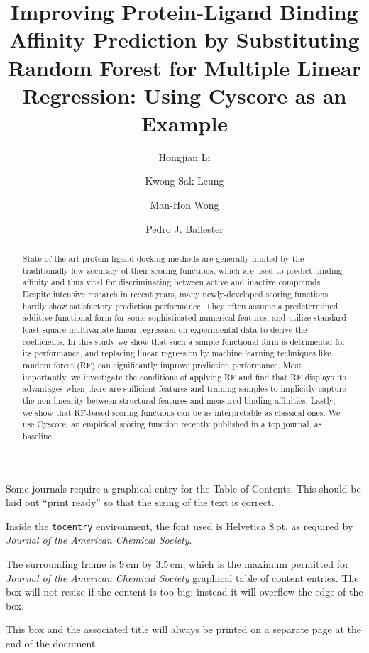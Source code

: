 \documentclass[journal=jacsat,manuscript=article]{achemso}
\author{Hongjian Li}
\author{Kwong-Sak Leung}
\author{Man-Hon Wong}
\affiliation[Chinese University of Hong Kong]
{Department of Computer Science and Engineering, Chinese University of Hong Kong, Shatin, New Territories, Hong Kong}
\author{Pedro J. Ballester}
\affiliation[European Bioinformatics Institute]
{European Bioinformatics Institute, Wellcome Trust Genome Campus, Hinxton, Cambridge - CB10 1SD, UK}
\title[RF::Cyscore]{Improving Protein-Ligand Binding Affinity Prediction by Substituting Random Forest for Multiple Linear Regression: Using Cyscore as an Example}
\begin{document}
\begin{tocentry}

Some journals require a graphical entry for the Table of Contents.
This should be laid out ``print ready'' so that the sizing of the
text is correct.

Inside the \texttt{tocentry} environment, the font used is Helvetica
8\,pt, as required by \emph{Journal of the American Chemical
Society}.

The surrounding frame is 9\,cm by 3.5\,cm, which is the maximum
permitted for  \emph{Journal of the American Chemical Society}
graphical table of content entries. The box will not resize if the
content is too big: instead it will overflow the edge of the box.

This box and the associated title will always be printed on a
separate page at the end of the document.

\end{tocentry}

\begin{abstract}

State-of-the-art protein-ligand docking methods are generally limited by the traditionally low accuracy of their scoring functions, which are used to predict binding affinity and thus vital for discriminating between active and inactive compounds. Despite intensive research in recent years, many newly-developed scoring functions hardly show satisfactory prediction performance. They often assume a predetermined additive functional form for some sophisticated numerical features, and utilize standard least-square multivariate linear regression on experimental data to derive the coefficients. In this study we show that such a simple functional form is detrimental for its performance, and replacing linear regression by machine learning techniques like random forest (RF) can significantly improve prediction performance. Most importantly, we investigate the conditions of applying RF and find that RF displays its advantages when there are sufficient features and training samples to implicitly capture the non-linearity between structural features and measured binding affinities. Lastly, we show that RF-based scoring functions can be as interpretable as classical ones. We use Cyscore, an empirical scoring function recently published in a top journal, as baseline.

\end{abstract}
\end{document}
